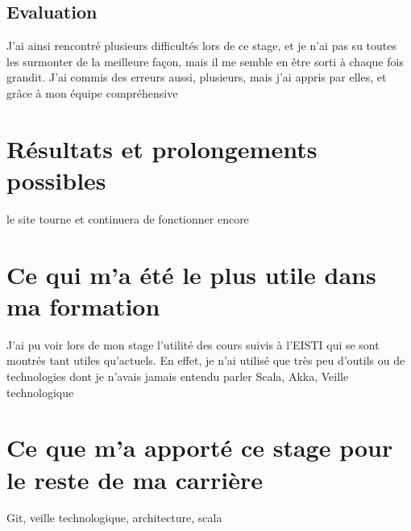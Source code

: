 \subsection{Evaluation}
\label{sub:Evaluation}
J'ai ainsi rencontré plusieurs difficultés lors de ce stage, et je n'ai pas su toutes les surmonter de la meilleure façon, mais il me semble en être sorti à chaque fois grandit.
J'ai commis des erreurs aussi, plusieurs, mais j'ai appris par elles, et grâce à mon équipe compréhensive




\section{Résultats et prolongements possibles}
le site tourne et continuera de fonctionner encore


\section{Ce qui m'a été le plus utile dans ma formation}
J'ai pu voir lors de mon stage l'utilité des cours suivis à l'EISTI qui se sont montrés tant utiles qu'actuels.
En effet, je n'ai utilisé que très peu d'outils ou de technologies dont je n'avais jamais entendu parler
Scala, Akka, Veille technologique


\section{Ce que m'a apporté ce stage pour le reste de ma carrière}
Git, veille technologique, architecture, scala

